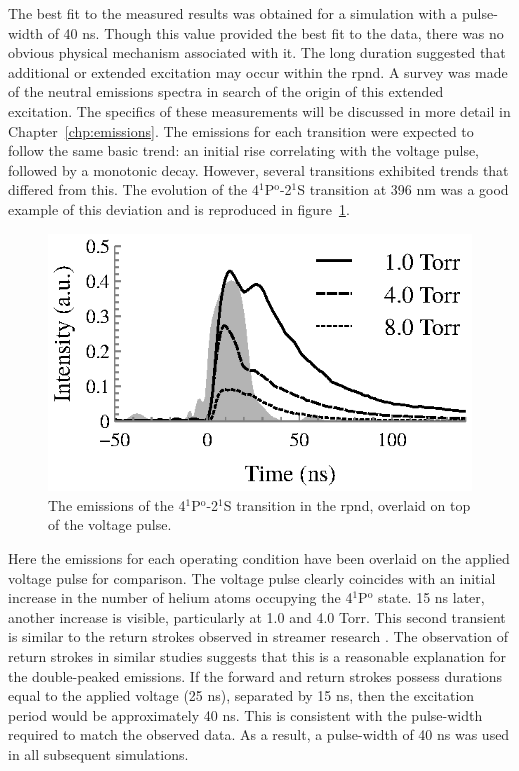 The best fit to the measured results was obtained for a simulation with a
pulse-width of 40 ns. Though this value provided the best fit to the data, there
was no obvious physical mechanism associated with it. The long duration
suggested that additional or extended excitation may occur within the
\acs{rpnd}. A survey was made of the neutral emissions spectra in search of the
origin of this extended excitation. The specifics of these measurements will be
discussed in more detail in Chapter~\ref{chp:emissions}. The emissions for each
transition were expected to follow the same basic trend: an initial rise
correlating with the voltage pulse, followed by a monotonic decay. However,
several transitions exhibited trends that differed from this. The evolution of
the 4$^1$P$^\mathrm{o}$-2$^1$S transition at 396 nm was a good example of this
deviation and is reproduced in figure~\ref{fig:double}.
\begin{figure}
  \centering
  \includegraphics{./chapters/modeling/figures/double.eps}
  \caption{The emissions of the 4$^1$P$^\mathrm{o}$-2$^1$S transition in the
  \acs{rpnd}, overlaid on top of the voltage pulse.}
  \label{fig:double}
\end{figure}
Here the emissions for each operating condition have been overlaid on the
applied voltage pulse for comparison. The voltage pulse clearly coincides with
an initial increase in the number of helium atoms occupying the
4$^1$P$^\mathrm{o}$ state. 15 ns later, another increase is visible,
particularly at 1.0 and 4.0 Torr. This second transient is similar to the return
strokes observed in streamer research \cite{Snoddy1936, Loeb1940, Mitchell1947}.
The observation of return strokes in similar studies \cite{Vasilyak1994,
Pai2009, Starikovskiy2013} suggests that this is a reasonable explanation for
the double-peaked emissions. If the forward and return strokes possess durations
equal to the applied voltage (25 ns), separated by 15 ns, then the excitation
period would be approximately 40 ns. This is consistent with the pulse-width
required to match the observed data. As a result, a pulse-width of 40 ns was
used in all subsequent simulations.

